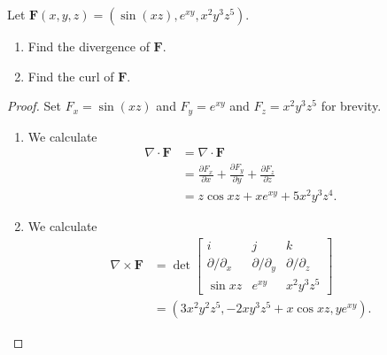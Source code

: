 \documentclass[openany]{book}
\begin{document}
\begin{prob}[10]
    Let \( \mathbf{F}(x, y, z) = (\sin(xz), e^{xy}, x^2y^3z^5) \).

    \begin{enumerate}
        \item[(a)] Find the divergence of \( \mathbf{F} \).
        \item[(b)] Find the curl of \( \mathbf{F} \).
    \end{enumerate}
\end{prob}
\begin{proof}
    Set $F_x=\sin(xz)$ and $F_y=e^{xy}$ and $F_z=x^2y^3z^5$ for brevity.
    \begin{enumerate}
        \item[(a)] We calculate
        \begin{align*}
            \nabla\cdot\mathbf F &= \nabla\cdot\mathbf F \\
            &= \frac{\partial F_x}{\partial x}+\frac{\partial F_y}{\partial y}+\frac{\partial F_z}{\partial z} \\
            &= z\cos xz+xe^{xy}+5x^2y^3z^4.
        \end{align*}
        \item[(b)] We calculate
        \begin{align*}
            \nabla\times\mathbf F &= \det\begin{bmatrix}
                i & j & k \\
                \partial/\partial_x & \partial/\partial_y & \partial/\partial_z \\
                \sin xz & e^{xy} & x^2y^3z^5
            \end{bmatrix} \\
            &= \left(3x^2y^2z^5,-2xy^3z^5+x\cos xz,ye^{xy}\right).
        \end{align*}
    \end{enumerate}
\end{proof}
\end{document}
